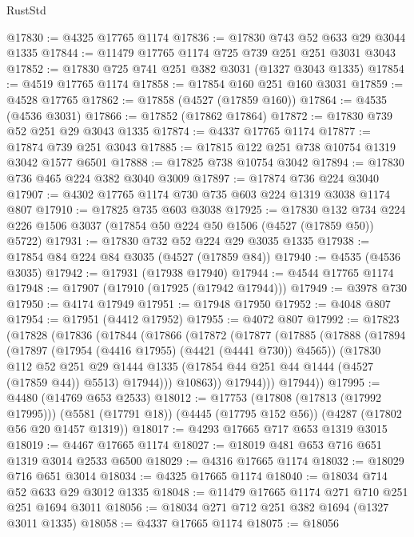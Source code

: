 \begin{lexlean}{RustStd}
\begin{coremodule}
@17830 := @4325 @17765 @1174
@17836 := @17830 @743 @52 @633 @29 @3044 @1335
@17844 := @11479 @17765 @1174 @725 @739 @251 @251 @3031 @3043
@17852 := @17830 @725 @741 @251 @382 @3031 (@1327 @3043 @1335)
@17854 := @4519 @17765 @1174
@17858 := @17854 @160 @251 @160 @3031
@17859 := @4528 @17765
@17862 := @17858 (@4527 (@17859 @160))
@17864 := @4535 (@4536 @3031)
@17866 := @17852 (@17862 @17864)
@17872 := @17830 @739 @52 @251 @29 @3043 @1335
@17874 := @4337 @17765 @1174
@17877 := @17874 @739 @251 @3043
@17885 := @17815 @122 @251 @738 @10754 @1319 @3042 @1577 @6501
@17888 := @17825 @738 @10754 @3042
@17894 := @17830 @736 @465 @224 @382 @3040 @3009
@17897 := @17874 @736 @224 @3040
@17907 := @4302 @17765 @1174 @730 @735 @603 @224 @1319 @3038 @1174 @807
@17910 := @17825 @735 @603 @3038
@17925 := @17830
    @132
    @734
    @224
    @226
    @1506
    @3037
    (@17854 @50 @224 @50 @1506 (@4527 (@17859 @50)) @5722)
@17931 := @17830 @732 @52 @224 @29 @3035 @1335
@17938 := @17854 @84 @224 @84 @3035 (@4527 (@17859 @84))
@17940 := @4535 (@4536 @3035)
@17942 := @17931 (@17938 @17940)
@17944 := @4544 @17765 @1174
@17948 := @17907 (@17910 (@17925 (@17942 @17944)))
@17949 := @3978 @730
@17950 := @4174 @17949
@17951 := @17948 @17950
@17952 := @4048 @807
@17954 := @17951 (@4412 @17952)
@17955 := @4072 @807
@17992 := @17823
    (@17828
      (@17836
        (@17844
          (@17866
            (@17872
              (@17877
                (@17885
                  (@17888
                    (@17894
                      (@17897 (@17954 (@4416 @17955) (@4421 (@4441 @730)) @4565))
                      (@17830
                        @112
                        @52
                        @251
                        @29
                        @1444
                        @1335
                        (@17854 @44 @251 @44 @1444 (@4527 (@17859 @44)) @5513)
                        @17944)))
                  @10863))
              @17944)))
        @17944))
@17995 := @4480 (@14769 @653 @2533)
@18012 := @17753
    (@17808 (@17813 (@17992 @17995)))
    (@5581 (@17791 @18))
    (@4445 (@17795 @152 @56))
    (@4287 (@17802 @56 @20 @1457 @1319))
@18017 := @4293 @17665 @717 @653 @1319 @3015
@18019 := @4467 @17665 @1174
@18027 := @18019 @481 @653 @716 @651 @1319 @3014 @2533 @6500
@18029 := @4316 @17665 @1174
@18032 := @18029 @716 @651 @3014
@18034 := @4325 @17665 @1174
@18040 := @18034 @714 @52 @633 @29 @3012 @1335
@18048 := @11479 @17665 @1174 @271 @710 @251 @251 @1694 @3011
@18056 := @18034 @271 @712 @251 @382 @1694 (@1327 @3011 @1335)
@18058 := @4337 @17665 @1174
@18075 := @18056

\end{coremodule}
\end{lexlean}
